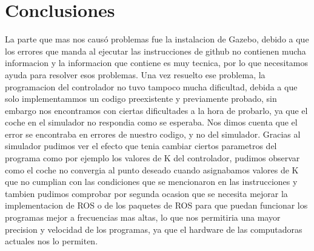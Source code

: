 \documentclass[journal]{IEEEtran}
\begin{document}
%





\section{Conclusiones}
La parte que mas nos causó problemas fue la instalacion de Gazebo, debido a que los errores que manda al ejecutar las instrucciones de github no contienen mucha informacion y la informacion que contiene es muy tecnica, por lo que necesitamos ayuda para resolver esos problemas. Una vez resuelto ese problema, la programacion del controlador no tuvo tampoco mucha dificultad, debida a que solo implementammos un codigo preexistente y previamente probado, sin embargo nos encontramos con ciertas dificultades a la hora de probarlo, ya que el coche en el simulador no respondia como se esperaba. Nos dimos cuenta que el error se encontraba en errores de nuestro codigo, y no del simulador.
Gracias al simulador pudimos ver el efecto que tenia cambiar ciertos parametros del programa como por ejemplo los valores de K del controlador, pudimos observar como el coche no convergia al punto deseado cuando asignabamos valores de K que no cumplian con las condiciones que se mencionaron en las instrucciones y tambien pudimos comprobar por segunda ocasion que se necesita mejorar la implementacion de ROS o de los paquetes de ROS para que puedan funcionar los programas mejor a frecuencias mas altas, lo que nos permitiria una mayor precision y velocidad de los programas, ya que el hardware de las computadoras actuales nos lo permiten.
\end{document}
